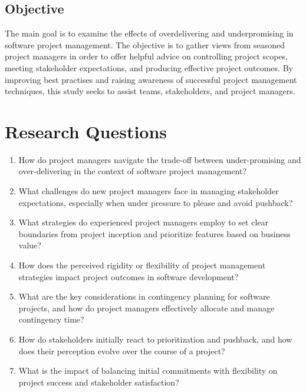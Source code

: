 \documentclass[12pt]{article}
\begin{document}
\subsection{Objective}
The main goal is to examine the effects of overdelivering and underpromising in software project management. The objective is to gather views from seasoned project managers in order to offer helpful advice on controlling project scopes, meeting stakeholder expectations, and producing effective project outcomes. By improving best practises and raising awareness of successful project management techniques, this study seeks to assist teams, stakeholders, and project managers.

\section{Research Questions }
\begin{enumerate}
    \item How do project managers navigate the trade-off between under-promising and over-delivering in the context of software project management?
\item What challenges do new project managers face in managing stakeholder expectations, especially when under pressure to please and avoid pushback?
\item What strategies do experienced project managers employ to set clear boundaries from project inception and prioritize features based on business value?
\item  How does the perceived rigidity or flexibility of project management strategies impact project outcomes in software development?
\item What are the key considerations in contingency planning for software projects, and how do project managers effectively allocate and manage contingency time?
\item How do stakeholders initially react to prioritization and pushback, and how does their perception evolve over the course of a project?
\item  What is the impact of balancing initial commitments with flexibility on project success and stakeholder satisfaction?
\end{enumerate}
\end{document}
